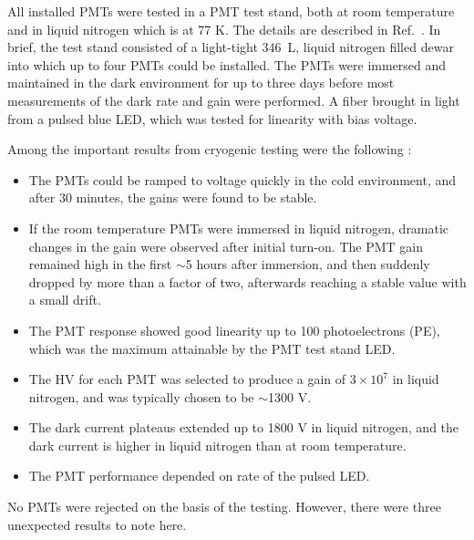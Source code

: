All installed PMTs were tested in a PMT test stand, both
at room temperature and in liquid nitrogen which is at 77 K.  
The details are described in Ref.~\cite{Briese:2013wua}.  
In brief, the test stand consisted of a light-tight 346~L, 
liquid nitrogen filled dewar into which up to four PMTs could be installed. 
The PMTs were immersed and maintained in the dark environment 
for up to three days before most measurements of the dark rate and gain were performed.  
A fiber brought in light from a pulsed blue LED, which was tested for linearity with bias voltage.  


Among the important results from cryogenic testing  were the following \cite{Briese:2013wua}:
\begin{itemize}
\item The PMTs could be ramped to voltage quickly in the cold environment, 
and after 30 minutes, the gains were found to be stable.
\item If the room temperature PMTs were immersed in liquid nitrogen, 
dramatic changes in the gain were observed after initial turn-on. 
The PMT gain remained high in the first $\sim$5 hours after immersion, 
and then suddenly dropped by more than a factor of two, 
afterwards reaching a stable value with a small drift.
\item The PMT response showed good linearity up to 100 photoelectrons (PE), 
which was the maximum attainable by the PMT test stand LED.  
\item The HV for each PMT was selected to produce a gain of $3\times 10^7$ in liquid nitrogen,
and was typically chosen to be $\sim$1300 V.
\item The dark current plateaus extended up to 1800 V in liquid nitrogen, and the dark current is higher in liquid nitrogen than at room temperature.
\item The PMT performance depended on rate of the pulsed LED.  
\end{itemize}
No PMTs were rejected on the basis of the testing.  
However, there were three unexpected results to note here.


